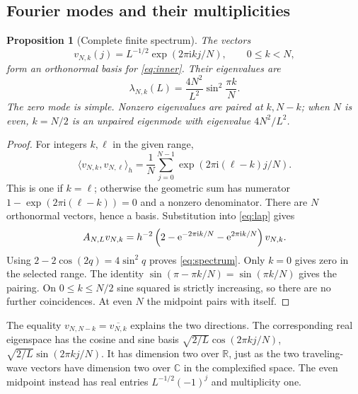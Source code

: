 \documentclass[11pt,a4paper]{article}
\newtheorem{proposition}[theorem]{Proposition}
\theoremstyle{definition}\newtheorem{definition}[theorem]{Definition}
\theoremstyle{remark}\newtheorem{remark}[theorem]{Remark}
\newcommand{\C}{\mathbb C}\newcommand{\R}{\mathbb R}\newcommand{\Z}{\mathbb Z}
\newcommand{\ee}{\mathrm e}\newcommand{\ii}{\mathrm i}
\newcommand{\ip}[2]{\langle #1,#2\rangle_h}
\numberwithin{equation}{section}
\begin{document}
\subsection{Fourier modes and their multiplicities}
\begin{proposition}[Complete finite spectrum]\label{prop:fourier}
The vectors
\begin{equation}
 v_{N,k}(j)=L^{-1/2}\exp(2\pi\ii kj/N),\qquad 0\leq k<N,
 \label{eq:fourier}
\end{equation}
form an orthonormal basis for \eqref{eq:inner}. Their eigenvalues are
\begin{equation}
 \lambda_{N,k}(L)=\frac{4N^2}{L^2}\sin^2\frac{\pi k}{N}.
 \label{eq:spectrum}
\end{equation}
The zero mode is simple. Nonzero eigenvalues are paired at \(k,N-k\);
when \(N\) is even, \(k=N/2\) is an unpaired eigenmode with eigenvalue
\(4N^2/L^2\).
\end{proposition}
\begin{proof}
For integers \(k,\ell\) in the given range,
\[
 \ip{v_{N,k}}{v_{N,\ell}}
 =\frac1N\sum_{j=0}^{N-1}\exp(2\pi\ii(\ell-k)j/N).
\]
This is one if \(k=\ell\); otherwise the geometric sum has numerator
\(1-\exp(2\pi\ii(\ell-k))=0\) and a nonzero denominator. There are \(N\)
orthonormal vectors, hence a basis. Substitution into \eqref{eq:lap} gives
\[
 \AN v_{N,k}
 =h^{-2}\left(2-\ee^{-2\pi\ii k/N}-\ee^{2\pi\ii k/N}\right)v_{N,k}.
\]
Using \(2-2\cos(2q)=4\sin^2q\) proves \eqref{eq:spectrum}.
Only \(k=0\) gives zero in the selected range.
The identity \(\sin(\pi-\pi k/N)=\sin(\pi k/N)\) gives the pairing.
On \(0\leq k\leq N/2\) sine squared is strictly increasing, so there
are no further coincidences. At even \(N\) the midpoint pairs with itself.
\end{proof}

The equality \(v_{N,N-k}=\overline{v_{N,k}}\) explains the two directions.
The corresponding real eigenspace has the cosine and sine basis
\(\sqrt{2/L}\cos(2\pi kj/N)\),
\(\sqrt{2/L}\sin(2\pi kj/N)\). It has dimension two over \(\R\), just
as the two traveling-wave vectors have dimension two over \(\C\) in the
complexified space. The even midpoint instead has real entries
\(L^{-1/2}(-1)^j\) and multiplicity one.
\end{document}
